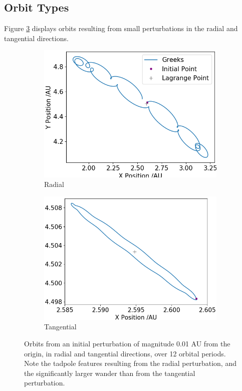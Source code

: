 \documentclass[11pt, a4paper,twocolumn]{article} %
\begin{document}
\subsection{Orbit Types} \label{orbits}
Figure \ref{fig:orbitplots} displays orbits resulting from small perturbations in the radial and tangential directions.

\begin{figure}[ht]
	\centering
	\begin{subfigure}{.23\textwidth}
		\centering
		\includegraphics[width=\linewidth]{Figures/radialp_orbits}  
		\caption{Radial}
		\label{fig:orbit_rad}
	\end{subfigure}
	\hfill %
	\begin{subfigure}{.23\textwidth}
		\centering
		\includegraphics[width=\linewidth]{Figures/tangentialp_orbits}  
		\caption{Tangential}
		\label{fig:orbit_tan}
	\end{subfigure}
	\caption{Orbits from an initial perturbation of magnitude 0.01 AU from the origin, in radial and tangential directions, over 12 orbital periods. Note the tadpole features resulting from the radial perturbation, and the significantly larger wander than from the tangential perturbation.}
	\label{fig:orbitplots}
\end{figure}
\end{document}
